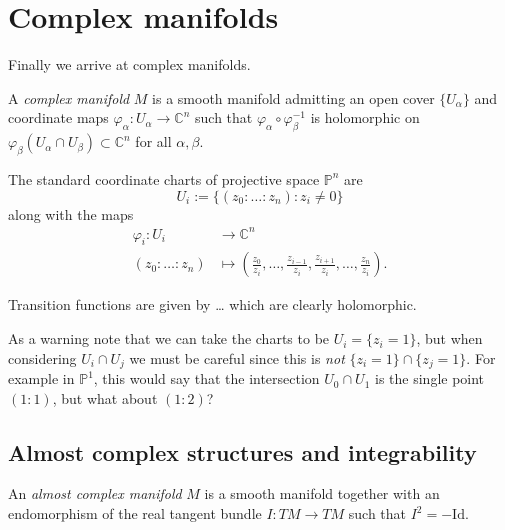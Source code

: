 \medskip\noindent
\section{Complex manifolds}
\label{section-complex-manifolds}

\noindent
Finally we arrive at complex manifolds.

\begin{definition}
\label{definition-complex-manifold}
A {\it complex manifold} $M$ is a smooth
manifold admitting an open cover
$\{U_\alpha\}$ and coordinate maps
$\varphi_\alpha:U_\alpha\to\mathbb{C}^n$ such
that $\varphi_\alpha\circ\varphi_\beta^{-1}$
is holomorphic on
$\varphi_\beta(U_\alpha\cap
U_\beta)\subset\mathbb{C}^n$ for all
$\alpha,\beta$.
\end{definition}

\begin{example}
\label{example-projective-space}
The standard coordinate charts of projective
space
$\mathbb{P}^n$ are
$$
U_i:=\{(z_0:…:z_n): z_i \neq 0\}
$$
along with the maps
$$
\begin{aligned}
\varphi_i: U_i &\longrightarrow \mathbb{C}^n
\\
(z_0:…:z_n) &\longmapsto
\left(\frac{z_0}{z_i},…,\frac{z_{i-1}}{z_i},
\frac{z_{i+1}}{z_i},…,\frac{z_n}{z_i}\right).
\end{aligned}
$$

\noindent
Transition functions are given by … which are
clearly holomorphic.
\end{example}

\noindent
As a warning note that we can take the charts
to be
$U_i=\{z_i=1\}$,
but when considering $U_i \cap U_j$
we must be careful since this is {\it not}
$\{z_i=1\}\cap \{z_j=1\}$.
For example in $\mathbb{P}^1$, this would say
that the intersection
$U_0 \cap U_1$
is the single point $(1:1)$, but what about
$(1:2)$?

\subsection{Almost complex structures and
integrability}
\label{subsection-almost-complex-integrability}

\begin{definition}
\label{definition-almost-complex-manifold}
An {\it almost complex manifold} $M$ is a
smooth manifold together with
an endomorphism of the real tangent bundle
$I:TM \to TM$
such that $I^2=-\text{Id}$.
\end{definition}

